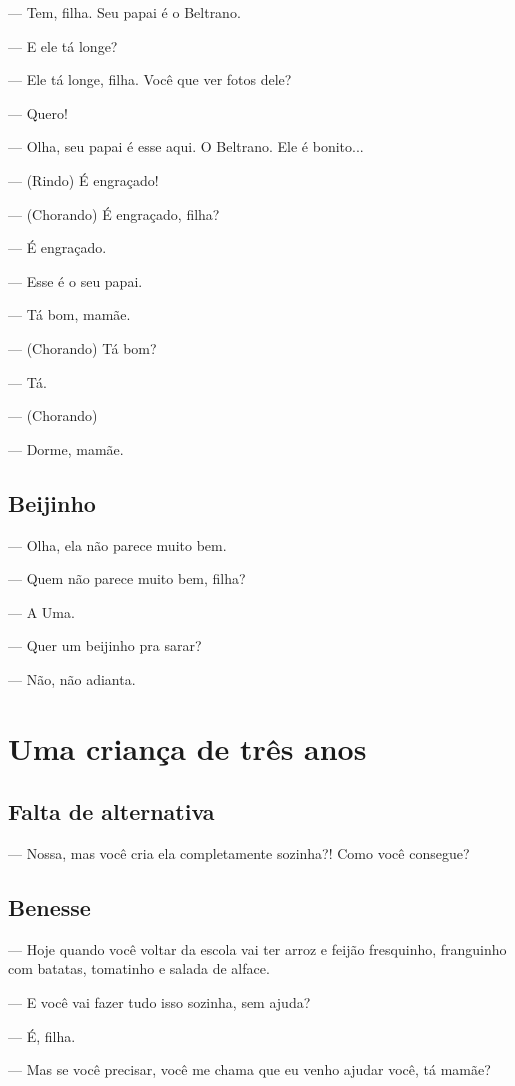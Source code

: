 — Tem, filha. Seu papai é o Beltrano.

— E ele tá longe?

— Ele tá longe, filha. Você que ver fotos dele?

— Quero!

— Olha, seu papai é esse aqui. O Beltrano. Ele é bonito...

— (Rindo) É engraçado!

— (Chorando) É engraçado, filha?

— É engraçado.

— Esse é o seu papai.

— Tá bom, mamãe.

— (Chorando) Tá bom?

— Tá.

— (Chorando)

— Dorme, mamãe.

\chapter{Beijinho}

— Olha, ela não parece muito bem.

— Quem não parece muito bem, filha?

— A Uma.

— Quer um beijinho pra sarar?

— Não, não adianta.

  \part{Uma criança de três anos}

\chapter{Falta de alternativa}

— Nossa, mas você cria ela completamente sozinha?! Como você consegue?

\chapter{Benesse}

— Hoje quando você voltar da escola vai ter arroz e feijão fresquinho,
franguinho com batatas, tomatinho e salada de alface.

— E você vai fazer tudo isso sozinha, sem ajuda?

— É, filha.

— Mas se você precisar, você me chama que eu venho ajudar você, tá
mamãe?

